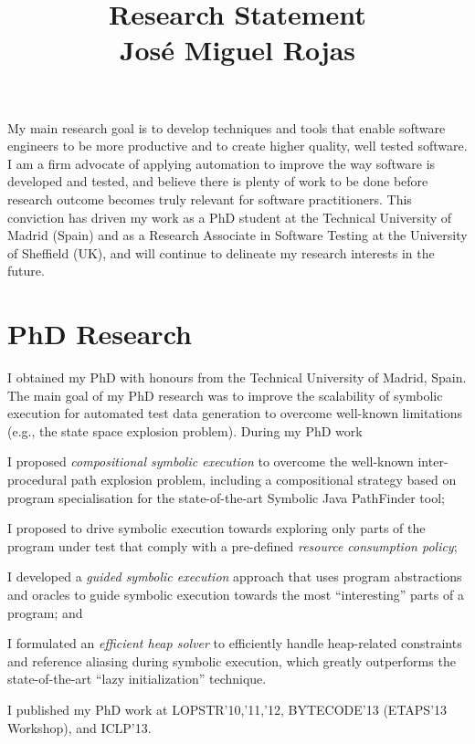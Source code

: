 \documentclass[a4paper]{article}
\title{Research Statement\\{\Large Jos\'e Miguel Rojas}}
\date{}
\begin{document}
\maketitle

My main research goal is to develop techniques and tools that enable
software engineers to be more productive and to create higher quality,
well tested software. I am a firm advocate of applying automation to
improve the way software is developed and tested, and believe there is
plenty of work to be done before research outcome becomes truly
relevant for software practitioners. This conviction has driven my
work as a PhD student at the Technical University of Madrid (Spain)
and as a Research Associate in Software Testing at the University of
Sheffield (UK), and will continue to delineate my research interests
in the future.

\section{PhD Research}

I obtained my PhD with honours from the Technical University of
Madrid, Spain. The main goal of my PhD research was to improve the
scalability of symbolic execution for automated test data generation
to overcome well-known limitations (e.g., the state space explosion
problem). During my PhD work
\begin{inparaenum}[(1)]
\item I proposed \emph{compositional symbolic execution} to overcome
  the well-known inter-procedural path explosion problem, including a
  compositional strategy based on program specialisation for the
  state-of-the-art Symbolic Java PathFinder tool;
\item I proposed to drive symbolic execution towards exploring only
  parts of the program under test that comply with a pre-defined
  \emph{resource consumption policy};
\item I developed a \emph{guided symbolic execution} approach that
  uses program abstractions and oracles to guide symbolic execution
  towards the most ``interesting'' parts of a program; and
\item I formulated an \emph{efficient heap solver} to efficiently
  handle heap-related constraints and reference aliasing during
  symbolic execution, which greatly outperforms the state-of-the-art
  ``lazy initialization'' technique.
\end{inparaenum}
I published my PhD work at LOPSTR'10,'11,'12, BYTECODE'13 (ETAPS'13
Workshop), and ICLP'13.
\end{document}
